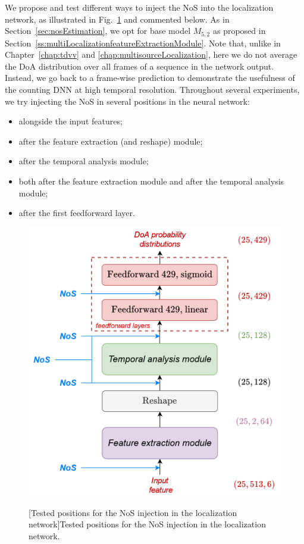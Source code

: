 We propose and test different ways to inject the NoS into the localization network, as illustrated in Fig.~\ref{fig:nosInjectionInLocalizationNetwork} and commented below. As in Section~\ref{sec:nosEstimation}, we opt for base model $M_{5,2}$ as proposed in Section~\ref{ss:multiLocalizationfeatureExtractionModule}. Note that, unlike in Chapter~\ref{chap:tdvv} and \ref{chap:multisourceLocalization}, here we do not average the DoA distribution over all frames of a sequence in the network output. Instead, we go back to a frame-wise prediction to demonstrate the usefulness of the counting DNN at high temporal resolution. Throughout several experiments, we try injecting the NoS in several positions in the neural network:
\begin{itemize}
    \item alongside the input features;
    \item after the feature extraction (and reshape) module;
    \item after the temporal analysis module;
    \item both after the feature extraction module and after the temporal analysis module;
    \item after the first feedforward layer.
\end{itemize}

\begin{figure}[t]
    \begin{adjustbox}{width=0.75\textwidth,center}
        \includegraphics[width=1.\linewidth]{Images/chap8/nosInjectionNetwork.png}
    \end{adjustbox}
    [Tested positions for the NoS injection in the localization network]{Tested positions for the NoS injection in the localization network.}
    \label{fig:nosInjectionInLocalizationNetwork}
\end{figure}

